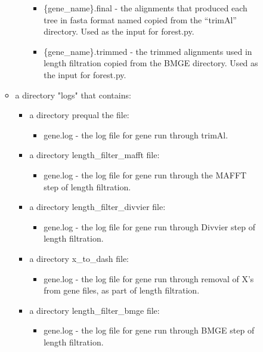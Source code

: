 \documentclass{article}
\begin{document}
\begin{enumerate}[itemsep=12pt]
\begin{description}
\begin{itemize}
\begin{itemize}
\begin{itemize}
                    \item \{gene\_name\}.final - the alignments that produced each tree in fasta format named copied from the “trimAl” directory. Used as the input for forest.py.
                    \item \{gene\_name\}.trimmed - the trimmed alignments used in length filtration copied from the BMGE directory. Used as the input for forest.py.
                \end{itemize}
            \end{itemize}
            \item a directory "logs" that contains:
                \begin{itemize}
                    \item a directory prequal the file:
                        \begin{itemize}
                            \item {gene}.log - the log file for {gene} run through trimAl.
                        \end{itemize}
                    \item a directory length\_filter\_mafft file:
                        \begin{itemize}
                            \item {gene}.log - the log file for {gene} run through the MAFFT step of length filtration.
                        \end{itemize}
                    \item a directory length\_filter\_divvier file:
                    \begin{itemize}
                            \item {gene}.log - the log file for {gene} run through Divvier step of length filtration.
                        \end{itemize}
                    \item a directory x\_to\_dash file:
                    \begin{itemize}
                            \item {gene}.log - the log file for {gene} run through removal of X's from gene files, as part of length filtration.
                        \end{itemize}
                    \item a directory length\_filter\_bmge file:
                    \begin{itemize}
                            \item {gene}.log - the log file for {gene} run through BMGE step of length filtration.

\end{itemize}
\end{itemize}
\end{itemize}
\end{description}
\end{enumerate}
\end{document}
